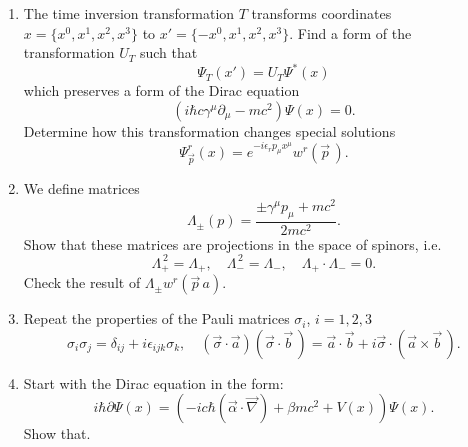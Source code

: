 \documentclass[a4paper,11pt]{article}
\begin{document}
\begin{enumerate}
\item The time inversion transformation $T$ transforms coordinates
  $x = \{ x^{ 0 }, x^{ 1 }, x^{ 2 }, x^{ 3 } \}$ to
  $x' = \{ -x^{ 0 }, x^{ 1 }, x^{ 2 }, x^{ 3 } \}$. Find a form of the
  transformation $U_{ T }$ such that
  \begin{equation}
    \label{QM:14}
    \Psi_{ T }( x' ) = U_{ T } \Psi^{ * }( x )
  \end{equation}
  which preserves a form of the Dirac equation
  \begin{equation}
    \label{QM:15}
    \left( i\hbar c \gamma^{ \mu } \partial_{ \mu } - m c^{ 2 } \right) \Psi( x ) = 0.
  \end{equation}
  Determine how this transformation changes special solutions
  \begin{equation}
    \label{QM:16}
    \Psi_{ \vec{ p } }^{ r }( x )
    = e^{ -i\epsilon_{ r } p_{ \mu } x^{ \mu } } w^{ r }( \vec{ p } \, ).
  \end{equation}

\item We define matrices
  \begin{equation}
    \label{QM:17}
    \Lambda_{ \pm }( p )
    = \frac{ \pm\gamma^{ \mu } p_{ \mu } + m c^{ 2 } }{ 2 m c^{ 2 } }.
  \end{equation}
  Show that these matrices are projections in the space of spinors,
  i.e.
  \begin{equation}
    \label{QM:18}
    \Lambda_{ + }^{ \, 2 } = \Lambda_{ + }, \quad
    \Lambda_{ - }^{ \, 2 } = \Lambda_{ - }, \quad
    \Lambda_{ + } \cdot \Lambda_{ - } = 0.
  \end{equation}
  Check the result of $\Lambda_{ \pm } w^{ r }( \vec{ p } \,a )$.

\item Repeat the properties of the Pauli matrices $\sigma_{ i }$,
  $i = 1, 2, 3$
  \begin{equation}
    \label{QM:19}
    \sigma_{ i } \sigma_{ j } = \delta_{ i j } + i \epsilon_{ i j k } \sigma_{ k }, \quad
    \left( \vec{ \sigma } \cdot \vec{ a } \right)
    \left( \vec{ \sigma } \cdot \vec{ b } \, \right)
    =
    \vec{ a } \cdot \vec{ b }
    + i \vec{ \sigma } \cdot \left( \vec{ a } \times \vec{ b } \, \right).
  \end{equation}

\item Start with the Dirac equation in the form:
  \begin{equation}
    \label{QM:20}
    i \hbar \partial \Psi( x )
    =
    \left( -ic\hbar \left( \vec{ \alpha } \cdot \vec{ \nabla } \right)
      + \beta m c^{ 2 } + V( x ) \right) \Psi( x ).
  \end{equation}
  Show that.


\end{enumerate}
\end{document}
